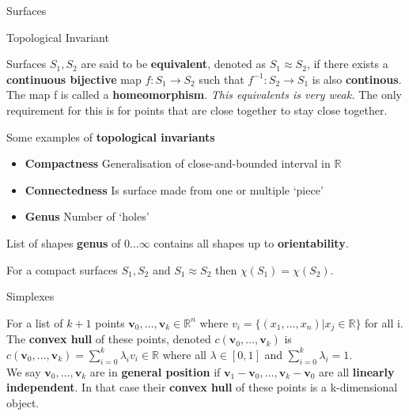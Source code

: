 \documentclass[12pt, letterpaper]{article}
\begin{document}
\begin{section}{Surfaces}
  \begin{subsection}{Topological Invariant}

    Surfaces \(S_{1}, S_{2}\) are said to be \textbf{equivalent}, denoted as
    \(S_{1} \approx S_{2}\), if there exists a \textbf{continuous bijective}
    map \(f: S_{1} \to S_{2}\) such that \(f^{-1}: S_{2} \to S_{1}\) is also
    \textbf{continous}. The map f is called a \textbf{homeomorphism}.
    \emph{This equivalents is very weak.} The only requirement for this is
    for points that are close together to stay close together.

    Some examples of \textbf{topological invariants}
    \begin{itemize}
      \item \textbf{Compactness}
            Generalisation of close-and-bounded interval in \(\mathbb{R}\)
      \item \textbf{Connectedness}
            Is surface made from one or multiple `piece'
      \item \textbf{Genus}
            Number of `holes'
    \end{itemize}

    List of shapes \textbf{genus} of \(0 \dots \infty\) contains all shapes
    up to \textbf{orientability}.

    For a compact surfaces \(S_{1}, S_{2}\) and \(S_{1} \approx S_{2}\) then
    \(\chi(S_{1}) = \chi(S_{2})\).

  \end{subsection}

  \begin{subsection}{Simplexes}

    For a list of \(k + 1\) points \(\textbf{v}_{0}, \dots , \textbf{v}_{k} \in \mathbb{R}^{n}\)
    where \(v_{i} = \{ (x_{1}, \dots , x_{n}) | x_{j} \in \mathbb{R} \}\) for all i.
    The \textbf{convex hull} of these points, denoted \(c(\textbf{v}_{0}, \dots , \textbf{v}_{k})\) is
    \(c(\textbf{v}_{0}, \dots , \textbf{v}_{k}) = \sum_{i = 0}^{k}\lambda_{i}v_{i} \in \mathbb{R}\)
    where all \(\lambda \in [0, 1]\) and \(\sum_{i = 0}^{k}\lambda_{i} = 1\). \\
    We say \(\textbf{v}_{0}, \dots , \textbf{v}_{k}\) are in \textbf{general position} if
    \(\textbf{v}_{1} - \textbf{v}_{0}, \dots , \textbf{v}_{k} - \textbf{v}_{0}\)
    are all \textbf{linearly independent}. In that case their \textbf{convex hull}
    of these points is a k-dimensional object.


\end{subsection}
\end{section}
\end{document}
